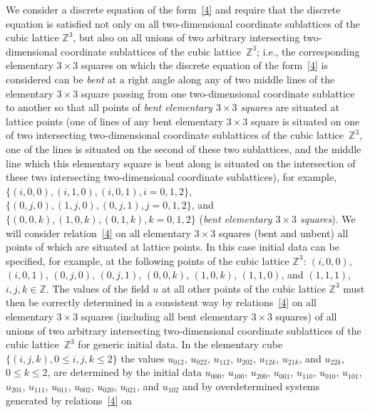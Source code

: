 \documentclass[pdftex]{sigma}
\begin{document}
We consider a discrete equation of the form~\eqref{4} and require
that the discrete equation is sa\-tis\-f\/ied not only on all
two-dimensional coordinate sublattices of the cubic lattice
$\mathbb{Z}^3$, but also on all unions of two arbitrary intersecting
two-dimensional coordinate sublattices of the cubic lattice~$\mathbb{Z}^3$; i.e., the corresponding elementary $3 \times 3$
squares on which the discrete equation of the form~\eqref{4} is
considered can be {\it bent} at a right angle along any of two
middle lines of the elementary $3 \times 3$ square passing from one
two-dimensional coordinate sublattice to another so that all points
of {\it bent elementary $3 \times 3$ squares} are situated at
lattice points (one of lines of any bent elementary $3 \times 3$
square is situated on one of two intersecting two-dimensional
coordinate sublattices of the cubic lattice~$\mathbb{Z}^3$, one of
the lines is situated on the second of these two sublattices, and
the middle line which this elementary square is bent along is
situated on the intersection of these two intersecting
two-dimensional coordinate sublattices), for example, $\{(i, 0, 0),
(i, 1, 0), (i, 0, 1), i = 0, 1, 2\}$, $\{(0, j, 0), (1, j, 0), (0,
j, 1), j = 0, 1, 2\}$, and $\{(0, 0, k), (1, 0, k), (0, 1, k), k =
0, 1, 2\}$ ({\it bent elementary $3 \times 3$ squares}). We will
consider relation~\eqref{4} on all elementary $3 \times 3$ squares
(bent and unbent) all points of which are situated at lattice
points. In this case initial data can be specif\/ied, for example, at
the following points of the cubic lattice $\mathbb{Z}^3$: $(i, 0,
0)$, $(i, 0, 1)$, $(0, j, 0)$, $(0, j, 1)$, $(0, 0, k)$, $(1, 0,
k)$, $(1, 1, 0)$, and $(1, 1, 1)$, $i, j, k \in \mathbb{Z}$. The
values of the f\/ield $u$ at all other points of the cubic lattice
$\mathbb{Z}^3$ must then be correctly determined in a consistent way
by relations~\eqref{4} on all elementary $3 \times 3$ squares
(including all bent elementary $3 \times 3$ squares) of all unions
of two arbitrary intersecting two-dimensional coordinate sublattices
of the cubic lattice~$\mathbb{Z}^3$ for generic initial data. In the
elementary cube $\{(i, j, k), 0 \leq i, j, k \leq 2 \}$ the values
$u_{0 1 2}$, $u_{0 2 2}$, $u_{1 1 2}$, $u_{2 0 2}$, $u_{1 2 k}$,
$u_{2 1 k}$, and $u_{2 2 k}$, $0 \leq k \leq 2$, are determined by
the initial data $u_{0 0 0}$, $u_{1 0 0}$, $u_{2 0 0}$, $u_{0 0 1}$,
$u_{1 1 0}$, $u_{0 1 0}$, $u_{1 0 1}$, $u_{2 0 1}$, $u_{1 1 1}$,
$u_{0 1 1}$, $u_{0 0 2}$, $u_{0 2 0}$, $u_{0 2 1}$, and $u_{1 0 2}$
and by overdetermined systems generated by relations~\eqref{4} on
\end{document}
